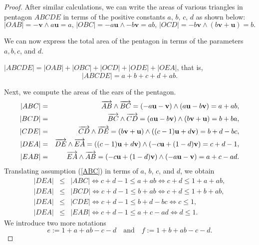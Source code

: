 \documentclass [10pt,oneside]{amsart}
\theoremstyle{definition}
\theoremstyle{plain}
\begin{document}
\begin{proof}
After similar calculations, we can write the areas of various
triangles in pentagon $ABCDE$ in terms of the positive constants
$a,\,b,\,c,\,d$ as shown below:
\begin{equation*}
|OAB|= -\mathbf{v}\wedge a\mathbf{u} = a,\,|OBC| = -a\mathbf{u}\wedge -b\mathbf{v} =ab,\,|OCD| = -b\mathbf{v}\wedge (b\mathbf{v}+ \mathbf{u}) =b.
\end{equation*}

We can now express the total area of the pentagon in terms of the parameters $a, b, c$, and $d$.

$|ABCDE| = |OAB| + |OBC| + |OCD| +
|ODE| + |OEA|$, that is,
\begin{equation}\label{ABCDE}
|ABCDE| = a+b+c+d+ab.
\end{equation}

Next, we compute the areas of the ears of the pentagon.
\begin{eqnarray}\label{laterlemma}
|ABC| &=& \overrightarrow{AB} \wedge \overrightarrow{BC}= (-a\mathbf{u}-\mathbf{v})\wedge (a\mathbf{u} - b\mathbf{v}) = a + ab,\notag\\
|BCD| &=& \overrightarrow{BC} \wedge \overrightarrow{CD}= (a\mathbf{u}- b\mathbf{v})\wedge (b\mathbf{v} + \mathbf{u}) = b + ba,\notag\\
|CDE| &=& \overrightarrow{CD} \wedge \overrightarrow{DE}= (b\mathbf{v}+\mathbf{u})\wedge ((c-1)\mathbf{u} + d\mathbf{v}) = b + d - bc,\\
|DEA| &=& \overrightarrow{DE} \wedge \overrightarrow{EA}= ((c-1)\mathbf{u}+ d\mathbf{v})\wedge (-c\mathbf{u} + (1-d)\mathbf{v}) = c +d -1,\notag\\
|EAB| &=& \overrightarrow{EA} \wedge \overrightarrow{AB}= (-c\mathbf{u}+ (1-d)\mathbf{v})\wedge (-a\mathbf{u} - \mathbf{v}) = a + c  -ad.\notag
\end{eqnarray}
Translating assumption (\ref{ABC}) in terms of $a$, $b$, $c$, and $d$, we obtain
\begin{eqnarray*}
|DEA| &\leq& |ABC|\iff c + d - 1 \leq a + ab
\iff c + d \leq 1+a+ab,\\
|DEA| &\leq& |BCD|\iff c + d - 1 \leq b + ab
\iff c + d \leq 1+b+ab,\\
|DEA| &\leq& |CDE| \iff c+d-1 \leq b+d-
bc\iff c\leq 1,\\
|DEA| &\leq& |EAB| \iff c+d-1 \leq a + c -
ad\iff d\leq 1.
\end{eqnarray*}
We introduce two more notations
\begin{equation}\label{ef}
e:=1+a+ab-c-d \quad \text{and}\quad f:=1+b+ab-c-d.
\end{equation}


\end{proof}
\end{document}
